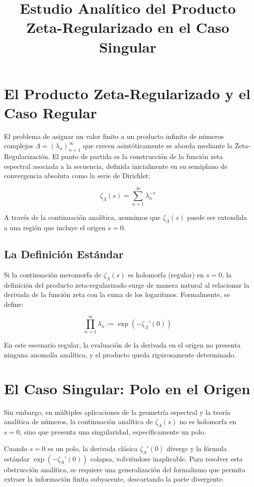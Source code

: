 \documentclass{article}
\title{Estudio Analítico del Producto Zeta-Regularizado en el Caso Singular}
\author{}
\date{}
\begin{document}
\maketitle

\section{El Producto Zeta-Regularizado y el Caso Regular}

El problema de asignar un valor finito a un producto infinito de números complejos $\Lambda = {(\lambda_n)}_{n=1}^{\infty}$ que crecen asintóticamente se aborda mediante la Zeta-Regularización. El punto de partida es la construcción de la función zeta espectral asociada a la secuencia, definida inicialmente en su semiplano de convergencia absoluta como la serie de Dirichlet:

\[
\zeta_\Lambda(s) = \sum_{n=1}^{\infty} \lambda_n^{-s}
\]

A través de la continuación analítica, asumimos que $\zeta_\Lambda(s)$ puede ser extendida a una región que incluye el origen $s=0$. 

\subsection{La Definición Estándar}

Si la continuación meromorfa de $\zeta_\Lambda(s)$ es holomorfa (regular) en $s=0$, la definición del producto zeta-regularizado surge de manera natural al relacionar la derivada de la función zeta con la suma de los logaritmos. Formalmente, se define:

\[
\prod_{n=1}^{\infty} \lambda_n := \exp\left(-\zeta_\Lambda'(0)\right)
\]

En este escenario regular, la evaluación de la derivada en el origen no presenta ninguna anomalía analítica, y el producto queda rigurosamente determinado.

\section{El Caso Singular: Polo en el Origen}

Sin embargo, en múltiples aplicaciones de la geometría espectral y la teoría analítica de números, la continuación analítica de $\zeta_\Lambda(s)$ no es holomorfa en $s=0$, sino que presenta una singularidad, específicamente un polo. 

Cuando $s=0$ es un polo, la derivada clásica $\zeta_\Lambda'(0)$ diverge y la fórmula estándar $\exp(-\zeta_\Lambda'(0))$ colapsa, volviéndose inaplicable. Para resolver esta obstrucción analítica, se requiere una generalización del formalismo que permita extraer la información finita subyacente, descartando la parte divergente.
\end{document}
